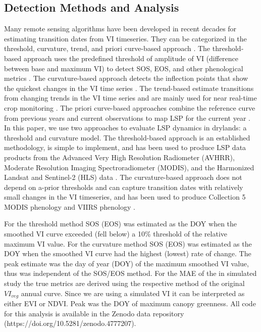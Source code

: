 \documentclass{article}
\begin{document}
\subsection{Detection Methods and Analysis}

Many remote sensing algorithms have been developed in recent decades for estimating transition dates from VI timeseries. They can be categorized in the threshold, curvature, trend, and priori curve-based approach \cite{gao-zhang2021}. The threshold-based approach uses the predefined threshold of amplitude of VI (difference between base and maximum VI) to detect SOS, EOS, and other phenological metrics \cite{jonsson2004, gray2019, bolton2020}. The curvature-based approach detects the inflection points that show the quickest changes in the VI time series \cite{zhang-friedl2003, zhang-liu2018, gao2017}. The trend-based estimate transitions from changing trends in the VI time series and are mainly used for near real-time crop monitoring \cite{gao2020a, gao2020b}. The priori curve-based approaches combine the reference curve from previous years and current observations to map LSP for the current year \cite{sakamoto2010, zhang-goldberg2012, liu-zhang2018}. In this paper, we use two approaches to evaluate LSP dynamics in drylands: a threshold and curvature model. The threshold-based approach is an established methodology, is simple to implement, and has been used to produce LSP data products from the Advanced Very High Resolution Radiometer (AVHRR), Moderate Resolution Imaging Spectroradiometer (MODIS), and the Harmonized Landsat and Sentinel-2 (HLS) data \cite{jonsson2004, gray2019, bolton2020}. The curvature-based approach does not depend on a-prior thresholds and can capture transition dates with relatively small changes in the VI timeseries, and has been used to produce Collection 5 MODIS phenology and VIIRS phenology \cite{zhang-friedl2003, zhang-liu2018}.

For the threshold method SOS (EOS) was estimated as the DOY when the smoothed VI curve exceeded (fell below) a 10\% threshold of the relative maximum VI value. For the curvature method SOS (EOS) was estimated as the DOY when the smoothed VI curve had the highest (lowest) rate of change. The peak estimate was the day of year (DOY) of the maximum smoothed VI value, thus was independent of the SOS/EOS method. For the MAE of the in simulated study the true metrics are derived using the respective method of the original $VI_{veg}$ annual curve. Since we are using a simulated VI it can be interpreted as either EVI or NDVI. Peak was the DOY of maximum canopy greenness. All code for this analysis is available in the Zenodo data repository (https://doi.org/10.5281/zenodo.4777207).
\end{document}
